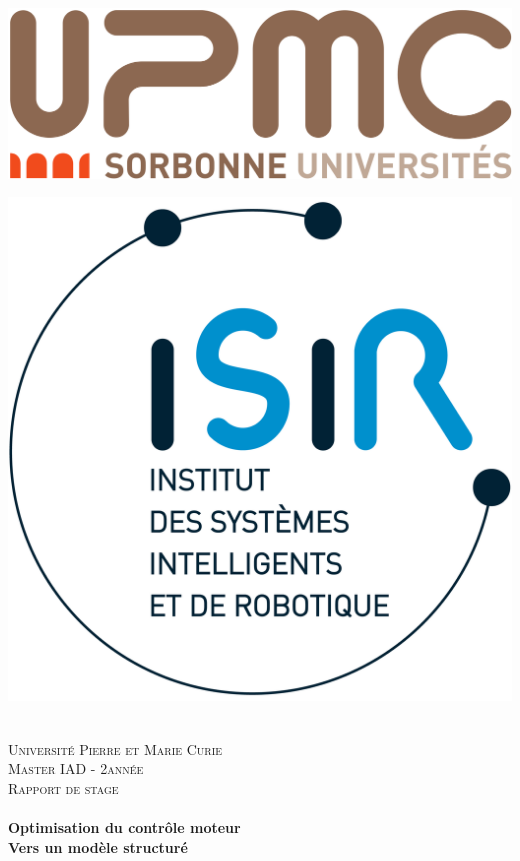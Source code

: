 \begin{titlepage}
\begin{center}
 
\begin{minipage}{0.4\textwidth}
	\begin{flushleft}
        \includegraphics[width=0.5\linewidth]{fig/logo_upmc}
	\end{flushleft}
\end{minipage}
\begin{minipage}{0.4\textwidth}
	\begin{flushright}
        \includegraphics[width=0.5\linewidth]{fig/logo_isir}
	\end{flushright}
\end{minipage}
\\[2cm]

\textsc{\LARGE Université Pierre et Marie Curie}\\[0.5cm]
\textsc{\Large Master IAD - 2\ieme année}\\[1.5cm]
\textsc{\Large Rapport de stage}\\[0.5cm]
 
\HRule \\[0.4cm]
{ \Large \bfseries Optimisation du contrôle moteur\\\medskip
                   Vers un modèle structuré }\\[0.4cm]
\HRule \\[1.5cm]
 

\end{center}
\end{titlepage}
